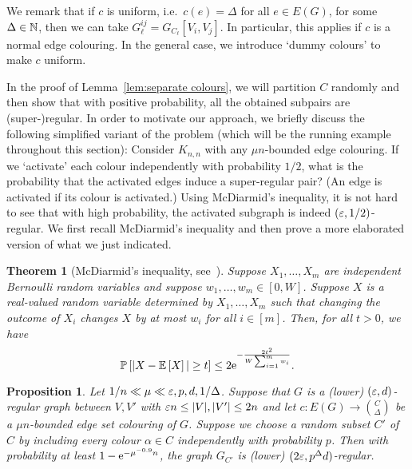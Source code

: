 \documentclass[10pt]{amsart}
\newtheorem{theorem}[algorithm]{Theorem}
\newtheorem{prop}[algorithm]{Proposition}
\theoremstyle{definition}
\theoremstyle{claimstyle}
\theoremstyle{stepstyle}
\numberwithin{equation}{section}
\begin{document}
We remark that if $c$ is uniform, i.e.~$c(e)=\Delta$ for all $e\in E(G)$, for some $\Delta\in \mathbb{N}$, then we can take $G_\ell^{ij}= G_{C_\ell}[V_i,V_j]$. In particular, this applies if $c$ is a normal edge colouring. In the general case, we introduce `dummy colours' to make $c$ uniform.

In the proof of Lemma~\ref{lem:separate colours},
we will partition $C$ randomly and then show that with positive probability, all the obtained subpairs are (super-)regular.
In order to motivate our approach, we briefly discuss the following simplified variant of the problem (which will be the running example throughout this section): Consider $K_{n,n}$ with any $\mu n$-bounded edge colouring. If we `activate' each colour independently with probability $1/2$, what is the probability that the activated edges induce a super-regular pair?
(An edge is activated if its colour is activated.)
Using McDiarmid's inequality, it is not hard to see that with high probability, the activated subgraph is indeed $({\varepsilon},1/2)$-regular.
We first recall McDiarmid's inequality and then prove a more elaborated version of what we just indicated.

\begin{theorem}[McDiarmid's inequality, see~\cite{mcdiarmid:89}] \label{thm:McDiarmid}
Suppose $X_1,\dots,X_m$ are independent Bernoulli random variables and suppose $w_1,\dots,w_m\in [0,W]$.
Suppose $X$ is a real-valued random variable determined by $X_1,\dots,X_m$ such that changing the outcome of $X_i$ changes $X$ by at most $w_i$ for all $i\in [m]$.
Then, for all $t>0$, we have $$\mathrm{\mathbb{P}}\left[|X-\mathrm{\mathbb{E}}\left[X\right]|\ge t\right] \le 2 {\rm e}^{-\frac{2t^2}{W\sum_{i=1}^m w_i}}.$$
\end{theorem}


\begin{prop}\label{prop:regularity slicing}
Let $1/n \ll \mu \ll  {\varepsilon} , p,d,1/\Delta$.
Suppose that $G$ is a (lower) $({\varepsilon},d)$-regular graph between $V,V'$ with ${\varepsilon} n\le |V|,|V'|\le 2n$ and let $c\colon E(G)\to \binom{C}{\Delta}$ be a $\mu n$-bounded edge set colouring of $G$.
Suppose we choose a random subset $C'$ of $C$ by including every colour $\alpha \in C$ independently with probability $p$.
Then with probability at least $1-{\rm e}^{-\mu^{-0.9} n}$,
the graph $G_{C'}$ is (lower) $(2{\varepsilon},p^{\Delta}d)$-regular.
\end{prop}
\end{document}
